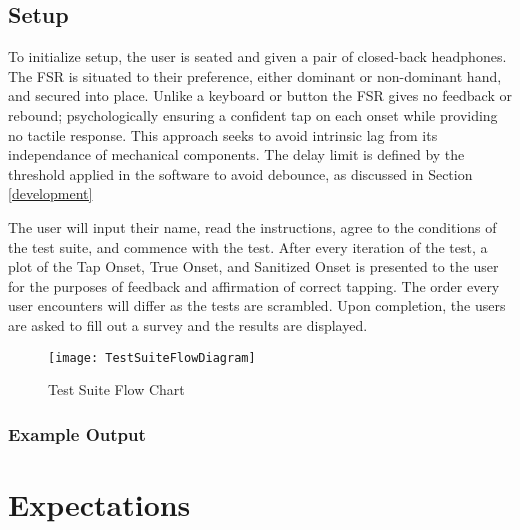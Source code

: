 \subsection{Setup} \label{testSetup}
To initialize setup, the user is seated and given a pair of closed-back headphones. The FSR is situated to their preference, either dominant or non-dominant hand, and secured into place. Unlike a keyboard or button the FSR gives no feedback or rebound; psychologically ensuring a confident tap on each onset while providing no tactile response. This approach seeks to avoid intrinsic lag from its independance of mechanical components. The delay limit is defined by the threshold applied in the software to avoid debounce, as discussed in Section \ref{development}

The user will input their name, read the instructions, agree to the conditions of the test suite, and commence with the test. After every iteration of the test, a plot of the Tap Onset, True Onset, and Sanitized Onset is presented to the user for the purposes of feedback and affirmation of correct tapping. The order every user encounters will differ as the tests are scrambled. Upon completion, the users are asked to fill out a survey and the results are displayed.

\begin{figure}[H]
    \centering
    \texttt{[image: TestSuiteFlowDiagram]}
    \caption{Test Suite Flow Chart}
    \label{fig:TestSuiteFlowDiagram}
\end{figure}

\subsubsection{Example Output}

\section{Expectations}
